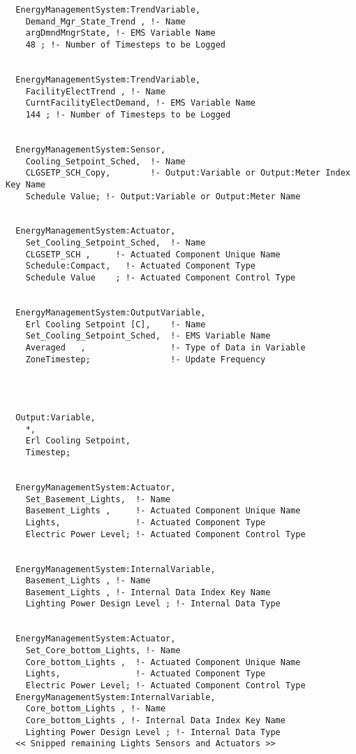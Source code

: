 \begin{lstlisting}
  EnergyManagementSystem:TrendVariable,
    Demand_Mgr_State_Trend , !- Name
    argDmndMngrState, !- EMS Variable Name
    48 ; !- Number of Timesteps to be Logged


  EnergyManagementSystem:TrendVariable,
    FacilityElectTrend , !- Name
    CurntFacilityElectDemand, !- EMS Variable Name
    144 ; !- Number of Timesteps to be Logged


  EnergyManagementSystem:Sensor,
    Cooling_Setpoint_Sched,  !- Name
    CLGSETP_SCH_Copy,        !- Output:Variable or Output:Meter Index Key Name
    Schedule Value; !- Output:Variable or Output:Meter Name


  EnergyManagementSystem:Actuator,
    Set_Cooling_Setpoint_Sched,  !- Name
    CLGSETP_SCH ,     !- Actuated Component Unique Name
    Schedule:Compact,   !- Actuated Component Type
    Schedule Value    ; !- Actuated Component Control Type


  EnergyManagementSystem:OutputVariable,
    Erl Cooling Setpoint [C],    !- Name
    Set_Cooling_Setpoint_Sched,  !- EMS Variable Name
    Averaged   ,                 !- Type of Data in Variable
    ZoneTimestep;                !- Update Frequency




  Output:Variable,
    *,
    Erl Cooling Setpoint,
    Timestep;


  EnergyManagementSystem:Actuator,
    Set_Basement_Lights,  !- Name
    Basement_Lights ,     !- Actuated Component Unique Name
    Lights,               !- Actuated Component Type
    Electric Power Level; !- Actuated Component Control Type


  EnergyManagementSystem:InternalVariable,
    Basement_Lights , !- Name
    Basement_Lights , !- Internal Data Index Key Name
    Lighting Power Design Level ; !- Internal Data Type


  EnergyManagementSystem:Actuator,
    Set_Core_bottom_Lights, !- Name
    Core_bottom_Lights ,  !- Actuated Component Unique Name
    Lights,               !- Actuated Component Type
    Electric Power Level; !- Actuated Component Control Type
  EnergyManagementSystem:InternalVariable,
    Core_bottom_Lights , !- Name
    Core_bottom_Lights , !- Internal Data Index Key Name
    Lighting Power Design Level ; !- Internal Data Type
  << Snipped remaining Lights Sensors and Actuators >>
\end{lstlisting}
